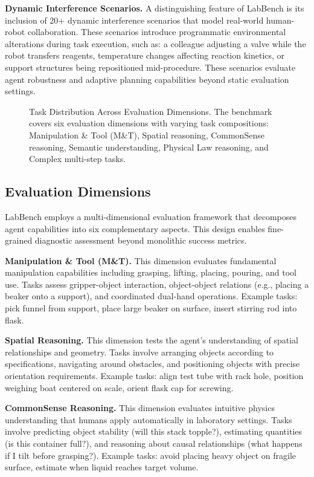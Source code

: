 \documentclass[letterpaper]{article} %
\begin{document}
\textbf{Dynamic Interference Scenarios.} A distinguishing feature of LabBench is its inclusion of 20+ dynamic interference scenarios that model real-world human-robot collaboration. These scenarios introduce programmatic environmental alterations during task execution, such as: a colleague adjusting a valve while the robot transfers reagents, temperature changes affecting reaction kinetics, or support structures being repositioned mid-procedure. These scenarios evaluate agent robustness and adaptive planning capabilities beyond static evaluation settings.

\begin{figure}[t]
\centering
\caption{Task Distribution Across Evaluation Dimensions. The benchmark covers six evaluation dimensions with varying task compositions: Manipulation \& Tool (M\&T), Spatial reasoning, CommonSense reasoning, Semantic understanding, Physical Law reasoning, and Complex multi-step tasks.}
\label{fig:task_distribution}
\end{figure}

\subsection{Evaluation Dimensions}

LabBench employs a multi-dimensional evaluation framework that decomposes agent capabilities into six complementary aspects. This design enables fine-grained diagnostic assessment beyond monolithic success metrics.

\textbf{Manipulation \& Tool (M\&T).} This dimension evaluates fundamental manipulation capabilities including grasping, lifting, placing, pouring, and tool use. Tasks assess gripper-object interaction, object-object relations (e.g., placing a beaker onto a support), and coordinated dual-hand operations. Example tasks: pick funnel from support, place large beaker on surface, insert stirring rod into flask.

\textbf{Spatial Reasoning.} This dimension tests the agent's understanding of spatial relationships and geometry. Tasks involve arranging objects according to specifications, navigating around obstacles, and positioning objects with precise orientation requirements. Example tasks: align test tube with rack hole, position weighing boat centered on scale, orient flask cap for screwing.

\textbf{CommonSense Reasoning.} This dimension evaluates intuitive physics understanding that humans apply automatically in laboratory settings. Tasks involve predicting object stability (will this stack topple?), estimating quantities (is this container full?), and reasoning about causal relationships (what happens if I tilt before grasping?). Example tasks: avoid placing heavy object on fragile surface, estimate when liquid reaches target volume.
\end{document}
